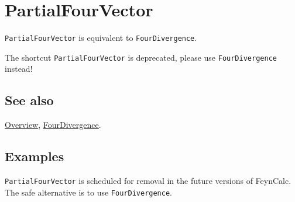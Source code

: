 \documentclass[../FeynCalcManual.tex]{subfiles}
\begin{document}
\hypertarget{partialfourvector}{
\section{PartialFourVector}\label{partialfourvector}}

\texttt{PartialFourVector} is equivalent to \texttt{FourDivergence}.

The shortcut \texttt{PartialFourVector} is deprecated, please use
\texttt{FourDivergence} instead!

\subsection{See also}

\hyperlink{toc}{Overview}, \hyperlink{fourdivergence}{FourDivergence}.

\subsection{Examples}

\texttt{PartialFourVector} is scheduled for removal in the future
versions of FeynCalc. The safe alternative is to use
\texttt{FourDivergence}.
\end{document}
